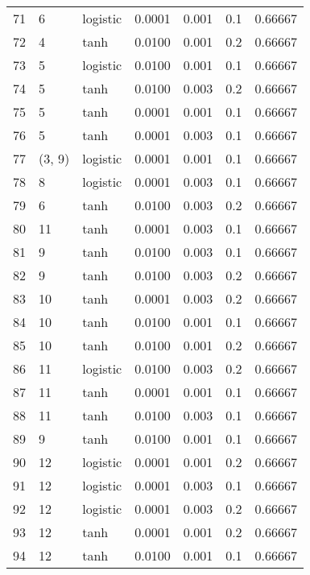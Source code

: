 \begin{tabular}{lllrrrr}
71  &           6 &  logistic &  0.0001 &  0.001 &  0.1 &   0.66667 \\
72  &           4 &      tanh &  0.0100 &  0.001 &  0.2 &   0.66667 \\
73  &           5 &  logistic &  0.0100 &  0.001 &  0.1 &   0.66667 \\
74  &           5 &      tanh &  0.0100 &  0.003 &  0.2 &   0.66667 \\
75  &           5 &      tanh &  0.0001 &  0.001 &  0.1 &   0.66667 \\
76  &           5 &      tanh &  0.0001 &  0.003 &  0.1 &   0.66667 \\
77  &      (3, 9) &  logistic &  0.0001 &  0.001 &  0.1 &   0.66667 \\
78  &           8 &  logistic &  0.0001 &  0.003 &  0.1 &   0.66667 \\
79  &           6 &      tanh &  0.0100 &  0.003 &  0.2 &   0.66667 \\
80  &          11 &      tanh &  0.0001 &  0.003 &  0.1 &   0.66667 \\
81  &           9 &      tanh &  0.0100 &  0.003 &  0.1 &   0.66667 \\
82  &           9 &      tanh &  0.0100 &  0.003 &  0.2 &   0.66667 \\
83  &          10 &      tanh &  0.0001 &  0.003 &  0.2 &   0.66667 \\
84  &          10 &      tanh &  0.0100 &  0.001 &  0.1 &   0.66667 \\
85  &          10 &      tanh &  0.0100 &  0.001 &  0.2 &   0.66667 \\
86  &          11 &  logistic &  0.0100 &  0.003 &  0.2 &   0.66667 \\
87  &          11 &      tanh &  0.0001 &  0.001 &  0.1 &   0.66667 \\
88  &          11 &      tanh &  0.0100 &  0.003 &  0.1 &   0.66667 \\
89  &           9 &      tanh &  0.0100 &  0.001 &  0.1 &   0.66667 \\
90  &          12 &  logistic &  0.0001 &  0.001 &  0.2 &   0.66667 \\
91  &          12 &  logistic &  0.0001 &  0.003 &  0.1 &   0.66667 \\
92  &          12 &  logistic &  0.0001 &  0.003 &  0.2 &   0.66667 \\
93  &          12 &      tanh &  0.0001 &  0.001 &  0.2 &   0.66667 \\
94  &          12 &      tanh &  0.0100 &  0.001 &  0.1 &   0.66667 \\

\end{tabular}
